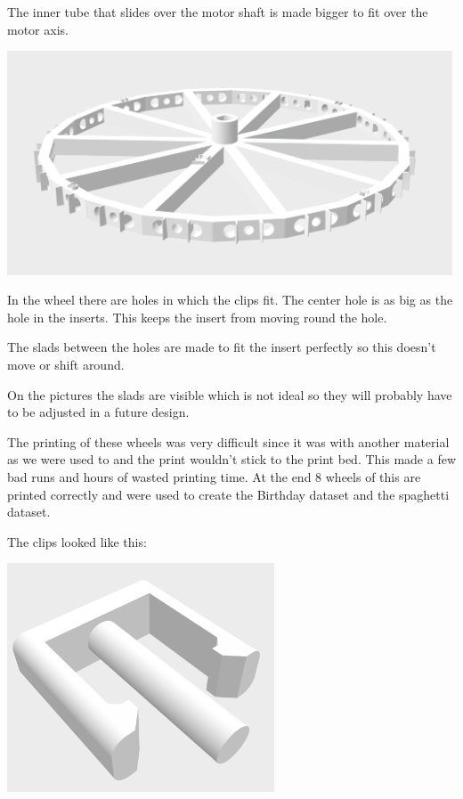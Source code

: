 The inner tube that slides over the motor shaft is made bigger to fit over the motor axis.



\includegraphics[width=5.208333in, keepaspectratio=true]{./fig/Camera_setup/Tool_Holder/Wheel_Holder/Second_Wheel_Holder/radhouder_v2.png}



In the wheel there are holes in which the clips fit. The center hole is as big as the hole in the inserts. This keeps the insert from moving round the hole.

The slads between the holes are made to fit the insert perfectly so this doesn't move or shift around. 



On the pictures the slads are visible which is not ideal so they will probably have to be adjusted in a future design.



The printing of these wheels was very difficult since it was with another material as we were used to and the print wouldn't stick to the print bed. This made a few bad runs and hours of wasted printing time. At the end 8 wheels of this are printed correctly and were used to create the Birthday dataset and the spaghetti dataset.



The clips looked like this:

\includegraphics[width=3.125000in, keepaspectratio=true]{./fig/Camera_setup/Tool_Holder/Wheel_Holder/Second_Wheel_Holder/clip_9.png}
